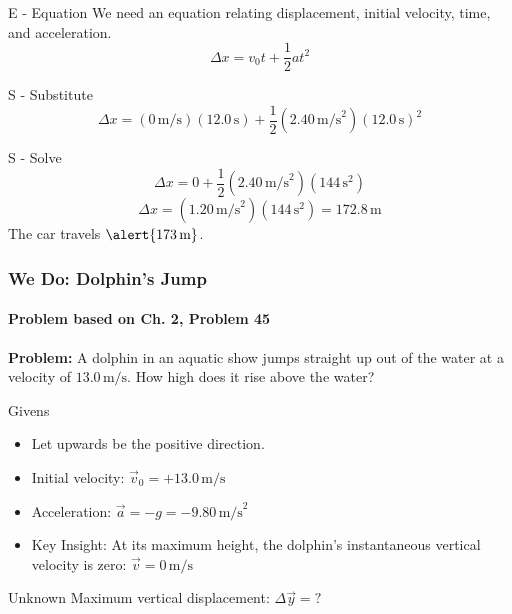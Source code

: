 \documentclass{beamer}
\begin{document}
\begin{frame}

\begin{block}{E - Equation}
    We need an equation relating displacement, initial velocity, time, and acceleration.
    \[ \Delta x = v_0 t + \frac{1}{2}at^2 \]
\end{block}
\begin{block}{S - Substitute}
    \[ \Delta x = (0 \, \text{m/s})(12.0 \, \text{s}) + \frac{1}{2}(2.40 \, \text{m/s}^2)(12.0 \, \text{s})^2 \]
\end{block}
\begin{block}{S - Solve}
    \[ \Delta x = 0 + \frac{1}{2}(2.40 \, \text{m/s}^2)(144 \, \text{s}^2) \]
    \[ \Delta x = (1.20 \, \text{m/s}^2)(144 \, \text{s}^2) = 172.8 \, \text{m} \]
    The car travels $\alert{173 \, \text{m}}$.
\end{block}
\end{frame}

\begin{frame}
\frametitle{We Do: Dolphin's Jump}
\framesubtitle{Problem based on Ch. 2, Problem 45}
\textbf{Problem:} A dolphin in an aquatic show jumps straight up out of the water at a velocity of $13.0 \, \text{m/s}$. How high does it rise above the water?

\begin{block}{Givens}
    \begin{itemize}
        \item Let upwards be the positive direction.
        \item Initial velocity: $\vec{v}_0 = +13.0 \, \text{m/s}$
        \item Acceleration: $\vec{a} = -g = -9.80 \, \text{m/s}^2$
        \item \alert{Key Insight:} At its maximum height, the dolphin's instantaneous vertical velocity is zero: $\vec{v} = 0 \, \text{m/s}$
    \end{itemize}
\end{block}
\begin{block}{Unknown}
    Maximum vertical displacement: $\Delta \vec{y} = ?$
\end{block}

\end{frame}
\end{document}
